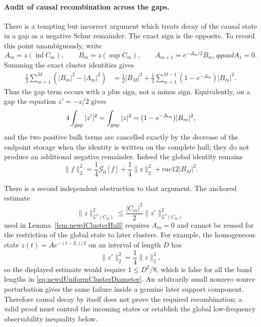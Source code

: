 \paragraph{Audit of causal recombination across the gaps.}
There is a tempting but incorrect argument which treats decay of the causal
state in a gap as a negative Schur remainder.  The exact sign is the
opposite.  To record this point unambiguously, write
\[
 A_m=z(\inf C_m),\qquad B_m=z(\sup C_m),\qquad
 A_{m+1}=e^{-\Delta_m/2}B_m,qquad A_1=0.
\]
Summing the exact cluster identities gives
\begin{align}
 \frac12\sum_{m=1}^M(|B_m|^2-|A_m|^2)
 &=\frac12|B_M|^2
   +\frac12\sum_{m=1}^{M-1}
      (1-e^{-\Delta_m})|B_m|^2.             
 \label{eq:newdGapAuditSign}
\end{align}
Thus the gap term occurs with a plus sign, not a minus sign.  Equivalently,
on a gap the equation $z'=-z/2$ gives
\[
 4\int_{\rm gap}|z'|^2
 =\int_{\rm gap}|z|^2
 =(1-e^{-\Delta_m})|B_m|^2,
\]
and the two positive bulk terms are cancelled exactly by the decrease of
the endpoint storage when the identity is written on the complete hull;
they do not produce an additional negative remainder.  Indeed the global
identity remains
\begin{equation}\label{eq:newdGlobalStateAuditIdentity}
 \|f\|_2^2
 =\frac14\mathcal G_0[f]
  +\frac14\|z\|_2^2+rac12|B_M|^2.
\end{equation}

There is a second independent obstruction to that argument.  The anchored
estimate
\[
 \|z\|_{L^2(C_m)}^2
 \leq\frac{|C_m|^2}{2}\|z'\|_{L^2(C_m)}^2
\]
used in Lemma~\ref{lem:newdClusterHull} requires $A_m=0$ and cannot be
reused for the restriction of the global state to later clusters.  For
example, the homogeneous state $z(t)=Ae^{-(t-L)/2}$ on an interval of
length $D$ has
\[
 \|z'\|_2^2=\frac14\|z\|_2^2,
\]
so the displayed estimate would require $1\leq D^2/8$, which is false for
all the band lengths in \eqref{eq:newdUniformClusterDiameter}.  An
arbitrarily small nonzero source perturbation gives the same failure inside
a genuine later support component.  Therefore causal decay by itself does
not prove the required recombination; a valid proof must control the
incoming states or establish the global low-frequency observability
inequality below.

